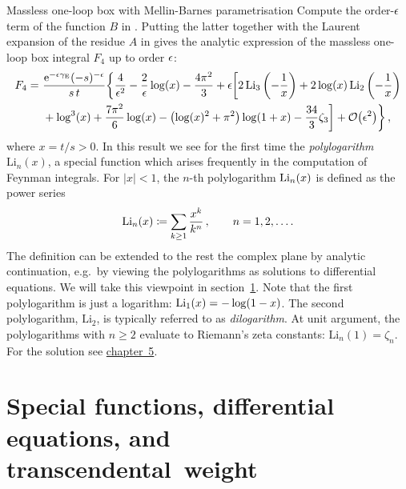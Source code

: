 \begin{exer}{Massless one-loop box with Mellin-Barnes parametrisation}
\label{Ex:4.BoxMellinBarnes}
Compute the order-$\epsilon$ term of the function $B$ in . Putting the latter together with the Laurent expansion of the residue $A$ in  gives the analytic expression of the massless one-loop box integral $F_4$ up to order $\epsilon$:
%
\begin{align}  \label{eq:F4final}
\begin{aligned}
F_4 = \ & \frac{\text{e}^{-\epsilon \gamma_{\text{E}}} (-s)^{-\epsilon}}{s \, t} \biggl\{ \frac{4}{\epsilon^2} - \frac{2}{\epsilon} \log(x) -\frac{4 \pi^2}{3} +
  \epsilon \biggl[  2 \, \text{Li}_3\left(-\frac{1}{x}\right) + 
 2 \log(x) \, \text{Li}_2\left(-\frac{1}{x}\right)    \\
& + \log^3(x) + \frac{7 \pi^2}{6} \log(x) - \bigl(\log(x)^2+ \pi^2 \bigr) \log(1 + x)  - \frac{34}{3} \zeta_3 \biggr] + \mathcal{O}\bigl(\epsilon^2\bigr) \biggr\} \,,
\end{aligned}
\end{align}
where $x=t/s>0$. In this result we see for the first time the \emph{polylogarithm} $\mathrm{Li}_n(x)$, a special function which arises frequently in the computation of Feynman integrals. 
For $|x|<1$, the $n$-th polylogarithm ${\rm Li}_{n}(x)$ is defined as the power series
\begin{align}\label{def_polylogarithm_series}
{\rm Li}_{n}(x) \coloneqq \sum_{k\ge1 }\frac{x^k}{k^n} \,,\quad \quad {n=1,2,\ldots} \,.
\end{align}
The definition can be extended to the rest the complex plane by analytic continuation, e.g.\ by viewing the polylogarithms as solutions to differential equations. We will take this viewpoint in section~\ref{ref:subsection:propertiesofspecialfunctions}.
Note that the first polylogarithm is just a logarithm: ${\rm Li}_{1}(x) = - \log(1-x)$. The second polylogarithm, $\mathrm{Li}_2$, is typically referred to as \emph{dilogarithm}. At unit argument, the polylogarithms with $n\ge 2$ evaluate to Riemann's zeta constants: $\mathrm{Li}_n(1) = \zeta_n$.
%
For the solution see \hyperref[Sol:4.BoxMellinBarnes]{chapter~5}.

\end{exer}



\section{Special functions, differential equations, and transcendental~weight}
\label{ref:subsection:propertiesofspecialfunctions}


